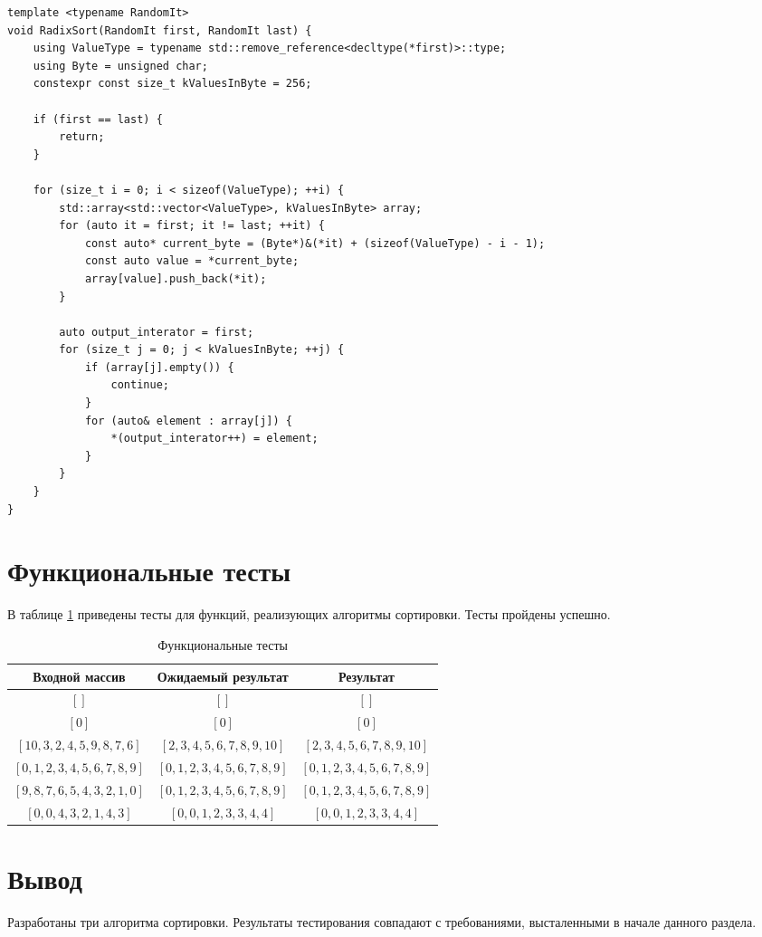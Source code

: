 \begin{lstlisting}[label=lst:sheyker_sort,caption=Алгоритм побитовой сортировки]
template <typename RandomIt>
void RadixSort(RandomIt first, RandomIt last) {
    using ValueType = typename std::remove_reference<decltype(*first)>::type;
    using Byte = unsigned char;
    constexpr const size_t kValuesInByte = 256;

    if (first == last) {
        return;
    }

    for (size_t i = 0; i < sizeof(ValueType); ++i) {
        std::array<std::vector<ValueType>, kValuesInByte> array;
        for (auto it = first; it != last; ++it) {
            const auto* current_byte = (Byte*)&(*it) + (sizeof(ValueType) - i - 1);
            const auto value = *current_byte;
            array[value].push_back(*it);
        }

        auto output_interator = first;
        for (size_t j = 0; j < kValuesInByte; ++j) {
            if (array[j].empty()) {
                continue;
            }
            for (auto& element : array[j]) {
                *(output_interator++) = element;
            }
        }
    }
}
\end{lstlisting}

\section{Функциональные тесты}

В таблице \ref{tbl:tests} приведены тесты для функций, реализующих алгоритмы сортировки. Тесты пройдены успешно.


\begin{table}[h]
	\begin{center}
		\captionsetup{justification=raggedright,singlelinecheck=off}
		\caption{\label{tbl:tests} Функциональные тесты}
		\begin{tabular}{|c|c|c|}
			\hline
			Входной массив & Ожидаемый результат & Результат \\
			\hline
			$[]$ & $[]$  & $[]$\\
			$[0]$  & $[0]$ & $[0]$\\
			$[10, 3, 2, 4, 5, 9, 8, 7, 6]$  & $[2, 3, 4, 5, 6, 7, 8, 9, 10]$  & $[2, 3, 4, 5, 6, 7, 8, 9, 10]$\\
			$[0, 1, 2, 3, 4, 5, 6, 7, 8, 9]$  & $[0, 1, 2, 3, 4, 5, 6, 7, 8, 9]$  & $[0, 1, 2, 3, 4, 5, 6, 7, 8, 9]$\\
			$[9, 8, 7, 6, 5, 4, 3, 2, 1, 0]$  & $[0, 1, 2, 3, 4, 5, 6, 7, 8, 9]$  & $[0, 1, 2, 3, 4, 5, 6, 7, 8, 9]$\\
			$[0, 0, 4, 3, 2, 1, 4, 3]$  & $[0, 0, 1, 2, 3, 3, 4, 4]$  & $[0, 0, 1, 2, 3, 3, 4, 4]$\\
			\hline
		\end{tabular}
	\end{center}
\end{table}


\section*{Вывод}

Разработаны три алгоритма сортировки. Результаты тестирования
совпадают с требованиями, высталенными в начале данного раздела.
